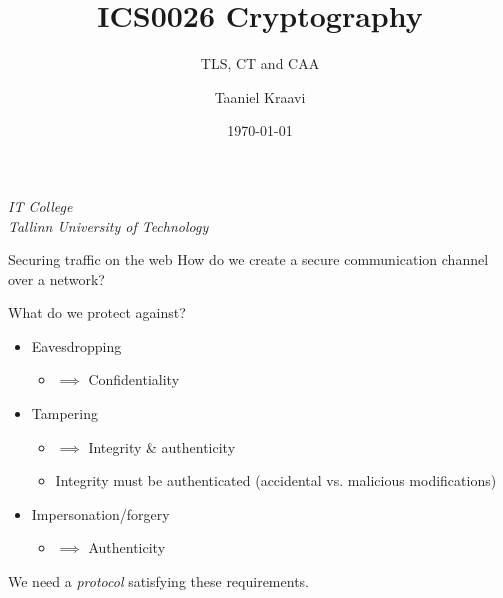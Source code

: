 \usepackage{tikz}
\usetikzlibrary{positioning,calc,external}

\title{ICS0026 Cryptography}
\subtitle{TLS, CT and CAA}
\date{\today}
\author{Taaniel Kraavi}
\institute%
{%
  \textit{IT College}\\
  \textit{Tallinn University of Technology}
}


\begin{frame}
  \titlepage
\end{frame}

\begin{frame}{Securing traffic on the web}
  How do we create a secure communication channel over a network?

  \vspace*{1em}

  \pause
  What do we protect against?
  \begin{itemize}[<+(1)->]
    \item Eavesdropping
    \begin{itemize}
      \item $\implies$ Confidentiality
    \end{itemize}
    \item Tampering
    \begin{itemize}
      \item $\implies$ Integrity \& authenticity
      \item Integrity must be authenticated (accidental vs. malicious modifications)
    \end{itemize}
    \item Impersonation/forgery
    \begin{itemize}
      \item $\implies$ Authenticity
    \end{itemize}
  \end{itemize}

  \vspace*{1em}

  \pause
  We need a \emph{protocol} satisfying these requirements.
\end{frame}

